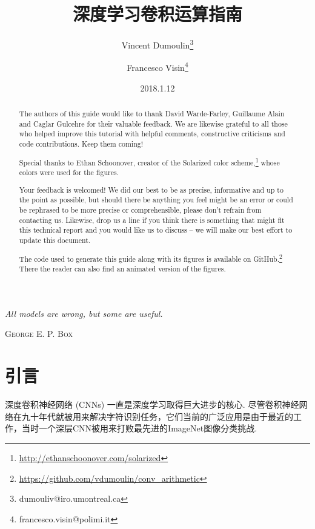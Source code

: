 \documentclass[notitlepage]{ctexrep}
\title{深度学习卷积运算指南}
\author[$\bigstar$]{Vincent Dumoulin\thanks{dumouliv@iro.umontreal.ca}}
\author[$\bigstar\dagger$]{Francesco Visin\thanks{francesco.visin@polimi.it}}
\affil[$\bigstar$]{MILA, Universit\'{e} de Montr\'{e}al}
\affil[$\dagger$]{AIRLab, Politecnico di Milano}
\date{2018.1.12}
\let\originalepigraph\epigraph
\renewcommand\epigraph[2]{\originalepigraph{\textit{#1}}{\textsc{#2}}}
\begin{document}
\maketitle
\thispagestyle{empty}
\clearpage

\setlength{\epigraphwidth}{0.4\textwidth}
\epigraph{All models are wrong, but some are useful.}{George E. P. Box}
\clearpage

\renewcommand{\abstractname}{Acknowledgements}
\begin{abstract}
    The authors of this guide would like to thank David Warde-Farley, Guillaume
    Alain and Caglar Gulcehre for their valuable feedback. We are likewise
    grateful to all those who helped improve this tutorial with helpful
    comments, constructive criticisms and code contributions. Keep them coming!

    Special thanks to Ethan Schoonover, creator of the Solarized color
    scheme,\footnote{\url{http://ethanschoonover.com/solarized}} whose colors
    were used for the figures.
\end{abstract}

\renewcommand{\abstractname}{Feedback}
\begin{abstract}
    Your feedback is welcomed! We did our best to be as precise, informative and
    up to the point as possible, but should there be anything you feel might be
    an error or could be rephrased to be more precise or comprehensible, please
    don't refrain from contacting us. Likewise, drop us a line if you think
    there is something that might fit this technical report and you would like
    us to discuss -- we will make our best effort to update this document.
\end{abstract}

\renewcommand{\abstractname}{Source code and animations}
\begin{abstract}
    The code used to generate this guide along with its figures is available on
    GitHub.\footnote{\url{https://github.com/vdumoulin/conv_arithmetic}} There
    the reader can also find an animated version of the figures.
\end{abstract}

\tableofcontents

\chapter{引言}

深度卷积神经网络 (CNNs) 一直是深度学习取得巨大进步的核心. 尽管卷积神经网络在九十年代就被用来解决字符识别任务\citep{le1997reading}，它们当前的广泛应用是由于最近的工作，当时一个深层CNN被用来打败最先进的ImageNet图像分类挑战\citep{krizhevsky2012imagenet}.
\end{document}
